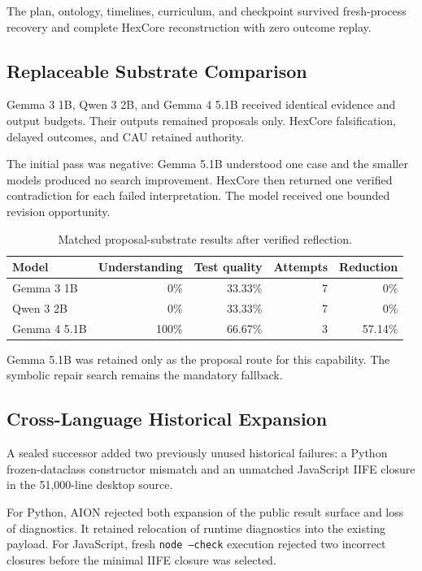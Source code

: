 The plan, ontology, timelines, curriculum, and checkpoint survived
fresh-process recovery and complete HexCore reconstruction with zero outcome
replay.

\subsection{Replaceable Substrate Comparison}

Gemma 3 1B, Qwen 3 2B, and Gemma 4 5.1B received identical evidence and output
budgets. Their outputs remained proposals only. HexCore falsification, delayed
outcomes, and CAU retained authority.

The initial pass was negative: Gemma 5.1B understood one case and the smaller
models produced no search improvement. HexCore then returned one verified
contradiction for each failed interpretation. The model received one bounded
revision opportunity.

\begin{table}[htbp]
\centering
\begin{tabular}{lrrrr}
\hline
\textbf{Model} & \textbf{Understanding} & \textbf{Test quality}
& \textbf{Attempts} & \textbf{Reduction}\\
\hline
Gemma 3 1B & 0\% & 33.33\% & 7 & 0\%\\
Qwen 3 2B & 0\% & 33.33\% & 7 & 0\%\\
Gemma 4 5.1B & 100\% & 66.67\% & 3 & 57.14\%\\
\hline
\end{tabular}
\caption{Matched proposal-substrate results after verified reflection.}
\end{table}

Gemma 5.1B was retained only as the proposal route for this capability. The
symbolic repair search remains the mandatory fallback.

\subsection{Cross-Language Historical Expansion}

A sealed successor added two previously unused historical failures: a Python
frozen-dataclass constructor mismatch and an unmatched JavaScript IIFE closure
in the 51,000-line desktop source.

For Python, AION rejected both expansion of the public result surface and loss
of diagnostics. It retained relocation of runtime diagnostics into the
existing payload. For JavaScript, fresh \texttt{node --check} execution
rejected two incorrect closures before the minimal IIFE closure was selected.


